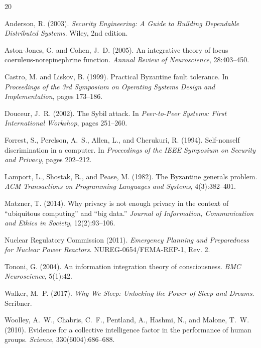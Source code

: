 \documentclass[11pt,a4paper]{article}
\begin{document}

\begin{thebibliography}{20}

Anderson, R. (2003).
\newblock \emph{Security Engineering: A Guide to Building Dependable Distributed Systems}.
\newblock Wiley, 2nd edition.

Aston-Jones, G. and Cohen, J.~D. (2005).
\newblock An integrative theory of locus coeruleus-norepinephrine function.
\newblock \emph{Annual Review of Neuroscience}, 28:403--450.

Castro, M. and Liskov, B. (1999).
\newblock Practical Byzantine fault tolerance.
\newblock In \emph{Proceedings of the 3rd Symposium on Operating Systems Design and Implementation}, pages 173--186.

Douceur, J.~R. (2002).
\newblock The Sybil attack.
\newblock In \emph{Peer-to-Peer Systems: First International Workshop}, pages 251--260.

Forrest, S., Perelson, A.~S., Allen, L., and Cherukuri, R. (1994).
\newblock Self-nonself discrimination in a computer.
\newblock In \emph{Proceedings of the IEEE Symposium on Security and Privacy}, pages 202--212.

Lamport, L., Shostak, R., and Pease, M. (1982).
\newblock The Byzantine generals problem.
\newblock \emph{ACM Transactions on Programming Languages and Systems}, 4(3):382--401.

Matzner, T. (2014).
\newblock Why privacy is not enough privacy in the context of ``ubiquitous computing'' and ``big data.''
\newblock \emph{Journal of Information, Communication and Ethics in Society}, 12(2):93--106.

Nuclear Regulatory Commission (2011).
\newblock \emph{Emergency Planning and Preparedness for Nuclear Power Reactors}.
\newblock NUREG-0654/FEMA-REP-1, Rev. 2.

Tononi, G. (2004).
\newblock An information integration theory of consciousness.
\newblock \emph{BMC Neuroscience}, 5(1):42.

Walker, M.~P. (2017).
\newblock \emph{Why We Sleep: Unlocking the Power of Sleep and Dreams}.
\newblock Scribner.

Woolley, A.~W., Chabris, C.~F., Pentland, A., Hashmi, N., and Malone, T.~W. (2010).
\newblock Evidence for a collective intelligence factor in the performance of human groups.
\newblock \emph{Science}, 330(6004):686--688.

\end{thebibliography}
\end{document}
